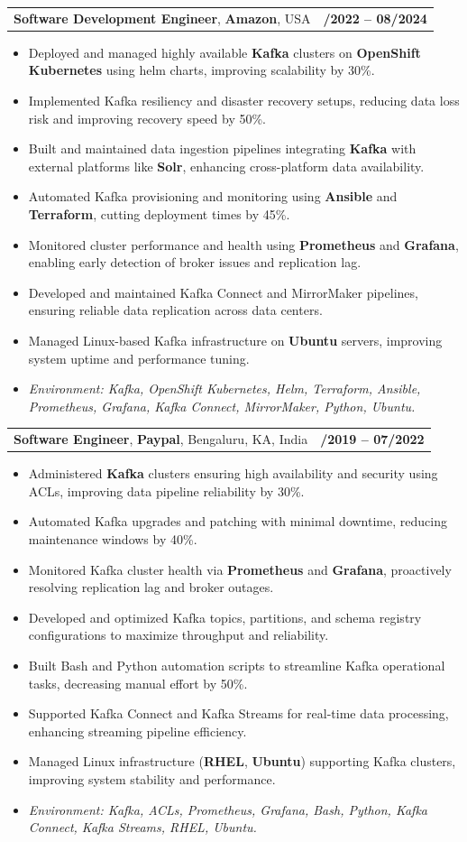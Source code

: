 \documentclass[letterpaper,11pt]{article}
\makeatletter
\newcommand{\resumeItem}[1]{
  \item\footnotesize{
    {#1 \vspace{-2pt}}
  }
}
\newcommand{\resumeSubheading}[4]{
  \vspace{-2pt}\item
    \begin{tabular*}{1.0\textwidth}[t]{l@{\extracolsep{\fill}}r}
      \textbf{\fontsize{10pt}{14pt}\selectfont #3}, \textbf{\fontsize{10pt}{14pt}\selectfont #1}, \fontsize{10pt}{14pt}\selectfont #4 & \textbf{\fontsize{10pt}{14pt}\selectfont #2} \\
    \end{tabular*}\vspace{-7pt}
}
\newcommand{\resumeItemListStart}{\begin{itemize}[leftmargin=*]}
\newcommand{\resumeItemListEnd}{\end{itemize}\vspace{-5pt}}
\makeatother
\begin{document}
\resumeSubheading
{Amazon}{10/2022 -- 08/2024}
{Software Development Engineer}{USA}
\resumeItemListStart
  \resumeItem{Deployed and managed highly available \textbf{Kafka} clusters on \textbf{OpenShift Kubernetes} using helm charts, improving scalability by 30\%.}
  \resumeItem{Implemented Kafka resiliency and disaster recovery setups, reducing data loss risk and improving recovery speed by 50\%.}
  \resumeItem{Built and maintained data ingestion pipelines integrating \textbf{Kafka} with external platforms like \textbf{Solr}, enhancing cross-platform data availability.}
  \resumeItem{Automated Kafka provisioning and monitoring using \textbf{Ansible} and \textbf{Terraform}, cutting deployment times by 45\%.}
  \resumeItem{Monitored cluster performance and health using \textbf{Prometheus} and \textbf{Grafana}, enabling early detection of broker issues and replication lag.}
  \resumeItem{Developed and maintained Kafka Connect and MirrorMaker pipelines, ensuring reliable data replication across data centers.}
  \resumeItem{Managed Linux-based Kafka infrastructure on \textbf{Ubuntu} servers, improving system uptime and performance tuning.}
  \resumeItem{\textit{Environment: Kafka, OpenShift Kubernetes, Helm, Terraform, Ansible, Prometheus, Grafana, Kafka Connect, MirrorMaker, Python, Ubuntu.}}
\resumeItemListEnd

\resumeSubheading
{Paypal}{08/2019 -- 07/2022}
{Software Engineer}{Bengaluru, KA, India}
\resumeItemListStart
  \resumeItem{Administered \textbf{Kafka} clusters ensuring high availability and security using ACLs, improving data pipeline reliability by 30\%.}
  \resumeItem{Automated Kafka upgrades and patching with minimal downtime, reducing maintenance windows by 40\%.}
  \resumeItem{Monitored Kafka cluster health via \textbf{Prometheus} and \textbf{Grafana}, proactively resolving replication lag and broker outages.}
  \resumeItem{Developed and optimized Kafka topics, partitions, and schema registry configurations to maximize throughput and reliability.}
  \resumeItem{Built Bash and Python automation scripts to streamline Kafka operational tasks, decreasing manual effort by 50\%.}
  \resumeItem{Supported Kafka Connect and Kafka Streams for real-time data processing, enhancing streaming pipeline efficiency.}
  \resumeItem{Managed Linux infrastructure (\textbf{RHEL}, \textbf{Ubuntu}) supporting Kafka clusters, improving system stability and performance.}
  \resumeItem{\textit{Environment: Kafka, ACLs, Prometheus, Grafana, Bash, Python, Kafka Connect, Kafka Streams, RHEL, Ubuntu.}}
\resumeItemListEnd
\end{document}
